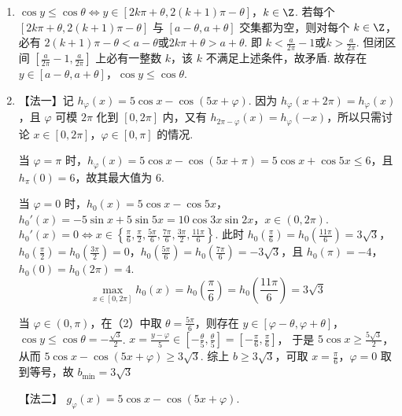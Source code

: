 \documentclass[UTF8,a4paper,oneside,11pt]{ctexbook}
\begin{document}
\begin{solution}
\begin{enumerate}
\item \(\cos y \le \cos\theta \iff y\in [2k\pi+\theta,2(k+1)\pi-\theta]\)，\(k\in\Z\). 若每个 \([2k\pi+\theta,2(k+1)\pi-\theta]\) 与 \([a-\theta,a+\theta]\) 交集都为空，则对每个 \(k\in\Z\)，必有 \(2(k+1)\pi - \theta < a-\theta\)或\(2k\pi + \theta > a+\theta\). 即 \(k < \frac{a}{2\pi} - 1\)或\(k > \frac{a}{2\pi}\). 但闭区间 \(\left[\frac{a}{2\pi}-1,\frac{a}{2\pi}\right]\) 上必有一整数 \(k\)，该 \(k\) 不满足上述条件，故矛盾. 故存在 \(y\in[a-\theta,a+\theta]\)，\(\cos y\le \cos\theta\).

\item 【法一】记 \(h_\varphi(x)=5\cos x-\cos (5x+\varphi)\). 因为 \(h_\varphi(x+2\pi)=h_\varphi(x)\)，且 \(\varphi\) 可模 \(2\pi\) 化到 \([0,2\pi]\) 内，又有 \(h_{2\pi-\varphi}(x)=h_\varphi(-x)\)，所以只需讨论 \(x\in[0,2\pi]\)，\(\varphi\in[0,\pi]\) 的情况.

当 \(\varphi=\pi\) 时，\(h_\varphi(x)=5\cos x-\cos(5x+\pi)=5\cos x+\cos 5x\le 6\)，且 \(h_{\pi}(0)=6\)，故其最大值为 \(6\).

当 \(\varphi=0\) 时，\(h_0(x)=5\cos x-\cos 5x\)，\(h_0'(x)=-5\sin x+5\sin 5x=10\cos 3x\sin 2x\)，\(x\in(0,2\pi)\). \(h_0'(x)=0 \iff x\in\left\{\frac{\pi}{6},\frac{\pi}{2},\frac{5\pi}{6},\frac{7\pi}{6},\frac{3\pi}{2},\frac{11\pi}{6}\right\}\).
此时 \(h_0\!\left(\frac{\pi}{6}\right)=h_0\!\left(\frac{11\pi}{6}\right)=3\sqrt{3}\)，\(h_0\!\left(\frac{\pi}{2}\right)=h_0\!\left(\frac{3\pi}{2}\right)=0\)，\(h_0\!\left(\frac{5\pi}{6}\right)=h_0\!\left(\frac{7\pi}{6}\right)=-3\sqrt{3}\)，且 \(h_0(\pi)=-4\)，\(h_0(0)=h_0(2\pi)=4\).
\[
\max_{x\in[0,2\pi]}h_0(x)=h_0\left(\frac{\pi}{6}\right)=h_0\left(\frac{11\pi}{6}\right)=3\sqrt{3}
\]

当 \(\varphi\in(0,\pi)\)，在（2）中取 \(\theta=\frac{5\pi}{6}\)，则存在
\(y\in[\varphi-\theta,\varphi+\theta]\)，\(\cos y\le \cos\theta=-\frac{\sqrt{3}}{2}\).
\(x=\frac{y-\varphi}{5}\in\left[-\frac{\theta}{5},\frac{\theta}{5}\right]=\left[-\frac{\pi}{6},\frac{\pi}{6}\right]\)，
于是 \(5\cos x\ge \frac{5\sqrt{3}}{2}\)，从而
\(5\cos x-\cos(5x+\varphi)\ge 3\sqrt{3}\).
综上 \(b\ge3\sqrt{3}\)，可取 \(x=\frac{\pi}{6}\)，\(\varphi=0\) 取到等号，故
\(
b_{\min}=3\sqrt{3}
\)

【法二】
\(g_\varphi(x)=5\cos x-\cos (5x+\varphi)\).


\end{enumerate}
\end{solution}
\end{document}
